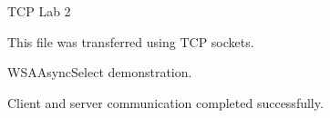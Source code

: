 \documentclass{article}
\begin{document}
TCP Lab 2

This file was transferred using TCP sockets.

WSAAsyncSelect demonstration.

Client and server communication completed successfully.
\end{document}
